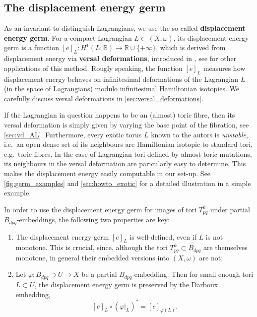 \documentclass[12pt,a4paper,abstract=true,draft]{scrartcl}
\begin{document}
\subsection{The displacement energy germ} 
\label{sec:intro_deg}

As an invariant to distinguish Lagrangians, we use the so called \textbf{displacement energy germ}.
For a compact Lagrangian $L \subset (X,\omega)$, its displacement energy germ is a function $[e]_L \colon H^1(L;\mathbb{R}) \rightarrow \mathbb{R} \cup \{+\infty\}$, which is derived from displacement energy via \textbf{versal deformations}, introduced in \cite{Che96}, see \cite{brendel2020real,brendel2023local,CheSch10} for other applications of this method.
Rougly speaking, the function $[e]_L$ measures how displacement energy behaves on infinitesimal deformations of the Lagrangian $L$ (in the space of Lagrangians) modulo infinitesimal Hamiltonian isotopies.
We carefully discuss versal deformations in \cref{sec:versal_deformations}. 

If the Lagrangian in question happens to be an (almost) toric fibre, then its versal deformation is simply given by varying the base point of the fibration, see \cref{sec:vd_AL}.
Furthermore, every exotic torus $L$ known to the autors is \emph{unstable}, i.e.\ an open dense set of its neighbours are Hamiltonian isotopic to standard tori, e.g.\ toric fibres.
In the case of Lagrangian tori defined by almost toric mutations, its neighbours in the versal deformation are paricularly easy to determine.
This makes the displacement energy easily computable in our set-up.
See \cref{fig:germ_examples} and \cref{sec:howto_exotic} for a detailed illustration in a simple example. 

In order to use the displacement energy germ for images of tori $T^k_{pq}$ under partial $B_{dpq}$-embeddings, the following two properties are key:

\begin{enumerate}
    \item The displacement energy germ $[e]_L$ is well-defined, even if $L$ is not monotone.
This is crucial, since, although the tori $T^k_{pq} \subset B_{dpq}$ are themselves monotone, in general their embedded versions into $(X,\omega)$ are not; 
    \item Let $\varphi \colon B_{dpq} \supset U \rightarrow X$ be a partial $B_{dpq}$-embedding.
Then for small enough tori $L \subset U$, the displacement energy germ is preserved by the Darboux embedding, 
    \begin{equation}
        \label{eq:locality}
        [e]_L \circ (\varphi\vert_L)^* = [e]_{\varphi(L)}.
    \end{equation}
\end{enumerate}
\end{document}
